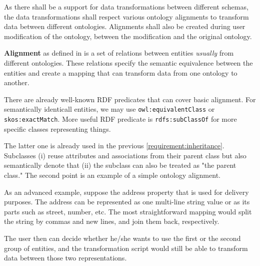 \begin{requirement}
    As there shall be a support for data transformations between different schemas, the data transformations shall respect various ontology alignments to transform data between different ontologies. Alignments shall also be created during user modification of the ontology, between the modification and the original ontology.
    \label{requirement:ontology-alignments}
\end{requirement}

\textbf{Alignment} as defined in \cite{euzenat_ontology_2013} is a set of relations between entities \textit{usually} from different ontologies. These relations specify the semantic equivalence between the entities and create a mapping that can transform data from one ontology to another.

There are already well-known RDF predicates that can cover basic alignment. For semantically identicall entities, we may use \verb|owl:equivalentClass| or \verb|skos:exactMatch|. More useful RDF predicate is \verb|rdfs:subClassOf| for more specific classes representing things.

The latter one is already used in the previous \autoref{requirement:inheritance}. Subclasses (i) reuse attributes and associations from their parent class but also semantically denote that (ii) the subclass can also be treated as "the parent class." The second point is an example of a simple ontology alignment.

\medskip

As an advanced example, suppose the address property that is used for delivery purposes. The address can be represented as one multi-line string value or as its parts such as street, number, etc. The most straightforward mapping would split the string by commas and new lines, and join them back, respectively.

The user then can decide whether he/she wants to use the first or the second group of entities, and the transformation script would still be able to transform data between those two representations.


